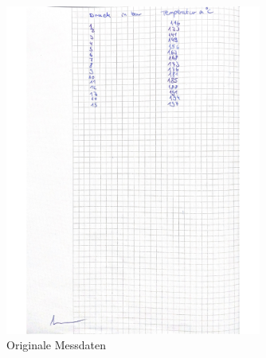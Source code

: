 \begin{figure}
    \centering
    \includegraphics[width=0.75\textwidth]{daten/daten3.jpg}
    \caption{Originale Messdaten}
    \label{fig:daten3}
\end{figure}
